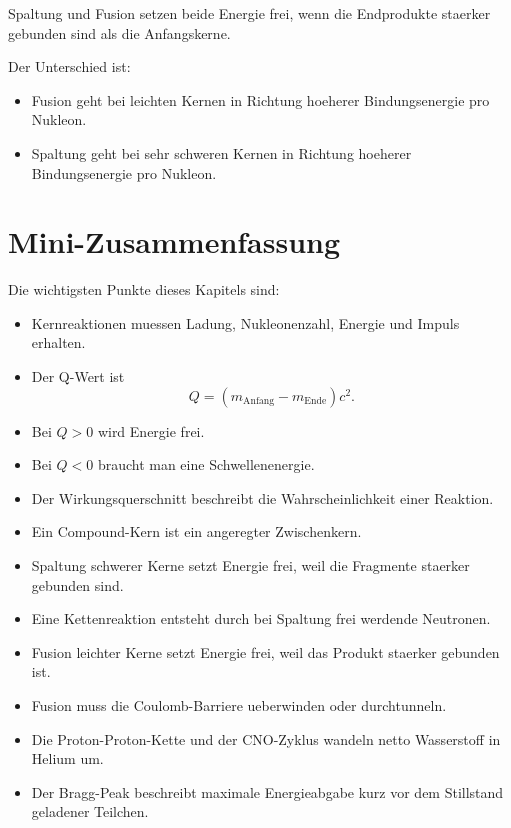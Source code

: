 \begin{examtipbox}
Spaltung und Fusion setzen beide Energie frei, wenn die Endprodukte staerker gebunden
sind als die Anfangskerne.

Der Unterschied ist:
\begin{itemize}
    \item Fusion geht bei leichten Kernen in Richtung hoeherer Bindungsenergie pro Nukleon.
    \item Spaltung geht bei sehr schweren Kernen in Richtung hoeherer Bindungsenergie pro Nukleon.
\end{itemize}
\end{examtipbox}

\section{Mini-Zusammenfassung}

\begin{notebox}
Die wichtigsten Punkte dieses Kapitels sind:
\begin{itemize}
    \item Kernreaktionen muessen Ladung, Nukleonenzahl, Energie und Impuls erhalten.
    \item Der Q-Wert ist
    \[
        Q =
        \left(
            m_{\mathrm{Anfang}}
            -
            m_{\mathrm{Ende}}
        \right)c^2.
    \]
    \item Bei $Q>0$ wird Energie frei.
    \item Bei $Q<0$ braucht man eine Schwellenenergie.
    \item Der Wirkungsquerschnitt beschreibt die Wahrscheinlichkeit einer Reaktion.
    \item Ein Compound-Kern ist ein angeregter Zwischenkern.
    \item Spaltung schwerer Kerne setzt Energie frei, weil die Fragmente staerker gebunden sind.
    \item Eine Kettenreaktion entsteht durch bei Spaltung frei werdende Neutronen.
    \item Fusion leichter Kerne setzt Energie frei, weil das Produkt staerker gebunden ist.
    \item Fusion muss die Coulomb-Barriere ueberwinden oder durchtunneln.
    \item Die Proton-Proton-Kette und der CNO-Zyklus wandeln netto Wasserstoff in Helium um.
    \item Der Bragg-Peak beschreibt maximale Energieabgabe kurz vor dem Stillstand geladener Teilchen.
\end{itemize}
\end{notebox}

